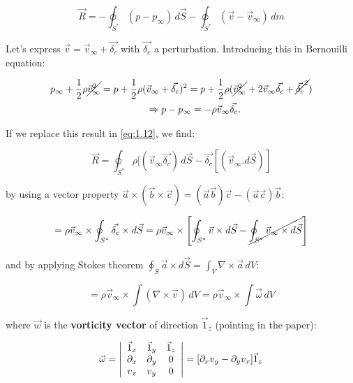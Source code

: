 \documentclass[british,french,11pt, a4paper, openany]{article}
\begin{document}
\begin{equation}
\vec{R} = -\oint _{S^*} (p-p_\infty) \, d\vec{S} - \oint _{S^*} (\vec{v}-\vec{v}_\infty) \, d\dot{m}
\label{eq:1.12}
\end{equation}

Let's express $\vec{v} = \vec{v}_\infty + \vec{\delta _c}$ with $\vec{\delta _c}$ a perturbation. Introducing this in Bernouilli equation: 

\begin{equation}
\begin{aligned}
p_\infty +\frac{1}{2} \rho \cancel{\vec{v}_\infty ^2} = p + \frac{1}{2} \rho( &\vec{v}_\infty + \vec{\delta _c})^2 = p + \frac{1}{2} \rho (\cancel{\vec{v}_\infty ^2} + 2 \vec{v}_\infty \vec{\delta _c} + \cancel{\vec{\delta _c}^2}) \\
&\Rightarrow p-p_\infty = - \rho\vec{v}_\infty \vec{\delta _c}	.		
\end{aligned}
\end{equation}

If we replace this result in \eqref{eq:1.12}, we find:

\begin{equation}
\vec{R} =\oint _{S^*} \rho [(\vec{v}_\infty \vec{\delta _c}) \, d\vec{S} - \vec{\delta _c} [(\vec{v}_\infty . d\vec{S})]
\end{equation}

by using a vector property $\vec{a} \times (\vec{b} \times \vec{c}) = (\vec{a} \vec{b})\vec{c} - (\vec{a}\vec{c})\vec{b}$:

\begin{equation}
= \rho \vec{v}_\infty \times \oint _{S^*} \vec{\delta _c} \times d\vec{S} = \rho \vec{v}_\infty \times \left[\oint _{S^*} \vec{v} \times d\vec{S} - \cancel{\oint _{S^*} \vec{v}_\infty \times d\vec{S}}\right]
\end{equation}

and by applying Stokes theorem $\oint _S \vec{a} \times d\vec{S} = \int _V \nabla \times \vec{a} \, dV$:

\begin{equation}
= \rho \vec{v}_\infty \times \int  (\nabla \times \vec{v})\, dV = \rho \vec{v}_\infty \times \int  \vec{\omega}\, dV
\end{equation}

where $\vec{w}$ is the \textbf{vorticity vector} of direction $\vec{1}_z$ (pointing in the paper):

\begin{equation}
\vec{\omega} = 
\left| \begin{array}{ccc}
\vec{1}_x & \vec{1}_y & \vec{1}_z \\ 
\D _x & \D _y & 0 \\ 
v_x & v_y & 0
\end{array} 
\right| 
= [\D _x v_y - \D _y v_x] \vec{1}_z
\end{equation}
\end{document}
